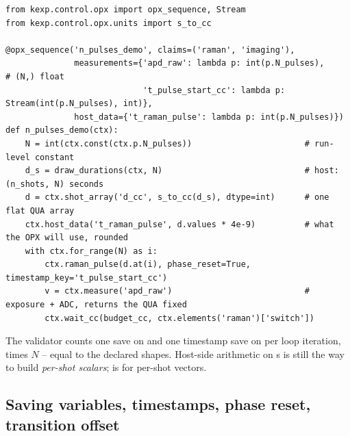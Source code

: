 \begin{lstlisting}[style=py]
from kexp.control.opx import opx_sequence, Stream
from kexp.control.opx.units import s_to_cc

@opx_sequence('n_pulses_demo', claims=('raman', 'imaging'),
              measurements={'apd_raw': lambda p: int(p.N_pulses),               # (N,) float
                            't_pulse_start_cc': lambda p: Stream(int(p.N_pulses), int)},
              host_data={'t_raman_pulse': lambda p: int(p.N_pulses)})
def n_pulses_demo(ctx):
    N = int(ctx.const(ctx.p.N_pulses))                       # run-level constant
    d_s = draw_durations(ctx, N)                             # host: (n_shots, N) seconds
    d = ctx.shot_array('d_cc', s_to_cc(d_s), dtype=int)      # one flat QUA array
    ctx.host_data('t_raman_pulse', d.values * 4e-9)          # what the OPX will use, rounded
    with ctx.for_range(N) as i:
        ctx.raman_pulse(d.at(i), phase_reset=True, timestamp_key='t_pulse_start_cc')
        v = ctx.measure('apd_raw')                           # exposure + ADC, returns the QUA fixed
        ctx.wait_cc(budget_cc, ctx.elements('raman')['switch'])
\end{lstlisting}

The validator counts one save on  and one timestamp save on
 per loop iteration, times $N$ -- equal to the
declared shapes. Host-side arithmetic on s is still the way
to build \emph{per-shot scalars};  is for per-shot vectors.

\subsection{Saving variables, timestamps, phase reset, transition offset}

